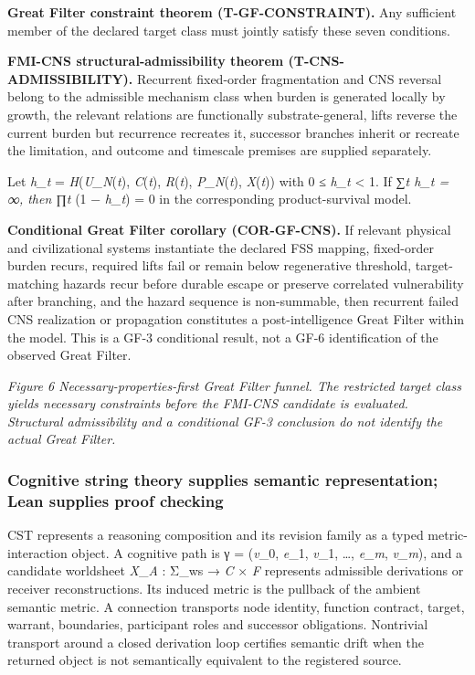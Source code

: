 \textbf{Great Filter constraint theorem (T-GF-CONSTRAINT).} Any
sufficient member of the declared target class must jointly satisfy
these seven conditions.

\textbf{FMI-CNS structural-admissibility theorem (T-CNS-ADMISSIBILITY).}
Recurrent fixed-order fragmentation and CNS reversal belong to the
admissible mechanism class when burden is generated locally by growth,
the relevant relations are functionally substrate-general, lifts reverse
the current burden but recurrence recreates it, successor branches
inherit or recreate the limitation, and outcome and timescale premises
are supplied separately.

Let \emph{h\_t} = \emph{H}(\emph{U\_N}(\emph{t}), \emph{C}(\emph{t}),
\emph{R}(\emph{t}), \emph{P\_N}(\emph{t}), \emph{X}(\emph{t})) with 0 ≤
\emph{h\_t} \textless{} 1. If ∑\emph{\emph{t} \emph{h\_t} = ∞, then ∏t}
(1 − \emph{h\_t}) = 0 in the corresponding product-survival model.

\textbf{Conditional Great Filter corollary (COR-GF-CNS).} If relevant
physical and civilizational systems instantiate the declared FSS
mapping, fixed-order burden recurs, required lifts fail or remain below
regenerative threshold, target-matching hazards recur before durable
escape or preserve correlated vulnerability after branching, and the
hazard sequence is non-summable, then recurrent failed CNS realization
or propagation constitutes a post-intelligence Great Filter within the
model. This is a GF-3 conditional result, not a GF-6 identification of
the observed Great Filter.

\emph{Figure 6 \textbar{} Necessary-properties-first Great Filter
funnel. The restricted target class yields necessary constraints before
the FMI-CNS candidate is evaluated. Structural admissibility and a
conditional GF-3 conclusion do not identify the actual Great Filter.}

\hypertarget{cognitive-string-theory-supplies-semantic-representation-lean-supplies-proof-checking}{%
\subsubsection{Cognitive string theory supplies semantic representation;
Lean supplies proof
checking}\label{cognitive-string-theory-supplies-semantic-representation-lean-supplies-proof-checking}}

CST represents a reasoning composition and its revision family as a
typed metric-interaction object. A cognitive path is γ = (\emph{v}\_0,
\emph{e}\_1, \emph{v}\_1, \ldots, \emph{e\_m}, \emph{v\_m}), and a
candidate worldsheet \emph{X}\_\emph{A} : Σ\_ws → \emph{C} × \emph{F}
represents admissible derivations or receiver reconstructions. Its
induced metric is the pullback of the ambient semantic metric. A
connection transports node identity, function contract, target, warrant,
boundaries, participant roles and successor obligations. Nontrivial
transport around a closed derivation loop certifies semantic drift when
the returned object is not semantically equivalent to the registered
source.

